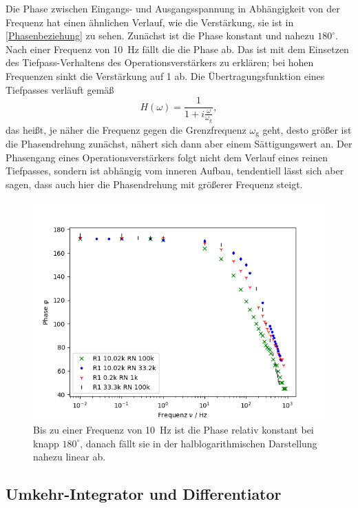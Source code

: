 Die Phase zwischen Eingangs- und Ausgangsspannung in Abhängigkeit von der Frequenz hat einen ähnlichen Verlauf, wie die Verstärkung, sie ist in \autoref{Phasenbeziehung} zu sehen. Zunächst ist die Phase konstant und nahezu $180^\circ$. Nach einer Frequenz von \SI{10}{\hertz} fällt die die Phase ab. Das ist mit dem Einsetzen des Tiefpass-Verhaltens des Operationsverstärkers zu erklären; bei hohen Frequenzen sinkt die Verstärkung auf 1 ab. Die Übertragungsfunktion eines Tiefpasses verläuft gemäß
\begin{equation}
	H(\omega) = \frac{1}{1 + i\frac{\omega}{\omega_\text{g}}},
\end{equation}
das heißt, je näher die Frequenz gegen die Grenzfrequenz $\omega_\text{g}$ geht, desto größer ist die Phasendrehung zunächst, nähert sich dann aber einem Sättigungswert an. Der Phasengang eines Operationsverstärkers folgt nicht dem Verlauf eines reinen Tiefpasses, sondern ist abhängig vom inneren Aufbau, tendentiell lässt sich aber sagen, dass auch hier die Phasendrehung mit größerer Frequenz steigt.

\begin{figure}[h]
	\centering
	\includegraphics[width=\textwidth]{img/j.png}
	\caption{Bis zu einer Frequenz von \SI{10}{\hertz} ist die Phase relativ konstant bei knapp $180^\circ$, danach fällt sie in der halblogarithmischen Darstellung nahezu linear ab.}
	\label{Phasenbeziehung}
\end{figure}

\FloatBarrier

\subsection{Umkehr-Integrator und Differentiator}

